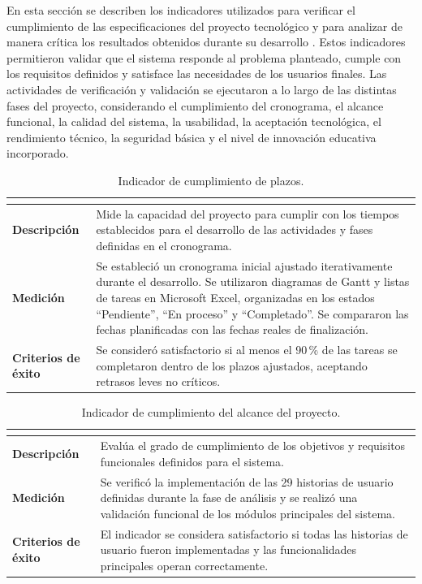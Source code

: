 En esta sección se describen los indicadores utilizados para verificar el cumplimiento de las especificaciones del proyecto tecnológico y para analizar de manera crítica los resultados obtenidos durante su desarrollo \cite{vlachogianni2022sus,brooke1996sus,davis1989tam}. Estos indicadores permitieron validar que el sistema responde al problema planteado, cumple con los requisitos definidos y satisface las necesidades de los usuarios finales. Las actividades de verificación y validación se ejecutaron a lo largo de las distintas fases del proyecto, considerando el cumplimiento del cronograma, el alcance funcional, la calidad del sistema, la usabilidad, la aceptación tecnológica, el rendimiento técnico, la seguridad básica y el nivel de innovación educativa incorporado.

\begin{table}[H]
\centering
\caption{Indicador de cumplimiento de plazos.}
\label{tab:ind_plazos}
\footnotesize
\renewcommand{\arraystretch}{1.25}
\begin{tabularx}{\textwidth}{|>{\bfseries}p{3.2cm}|X|}
\hline
\rowcolor{headblue}\multicolumn{2}{|c|}{\textbf{Cumplimiento de plazos}}\\\hline
Descripción & Mide la capacidad del proyecto para cumplir con los tiempos establecidos para el desarrollo de las actividades y fases definidas en el cronograma. \\\hline
Medición & Se estableció un cronograma inicial ajustado iterativamente durante el desarrollo. Se utilizaron diagramas de Gantt y listas de tareas en Microsoft Excel, organizadas en los estados ``Pendiente'', ``En proceso'' y ``Completado''. Se compararon las fechas planificadas con las fechas reales de finalización. \\\hline
Criterios de éxito & Se consideró satisfactorio si al menos el 90\,\% de las tareas se completaron dentro de los plazos ajustados, aceptando retrasos leves no críticos. \\\hline
\end{tabularx}
\end{table}
\fuenteautor

\begin{table}[H]
\centering
\caption{Indicador de cumplimiento del alcance del proyecto.}
\label{tab:ind_alcance}
\footnotesize
\renewcommand{\arraystretch}{1.25}
\begin{tabularx}{\textwidth}{|>{\bfseries}p{3.2cm}|X|}
\hline
\rowcolor{headblue}\multicolumn{2}{|c|}{\textbf{Cumplimiento del alcance}}\\\hline
Descripción & Evalúa el grado de cumplimiento de los objetivos y requisitos funcionales definidos para el sistema. \\\hline
Medición & Se verificó la implementación de las 29 historias de usuario definidas durante la fase de análisis y se realizó una validación funcional de los módulos principales del sistema. \\\hline
Criterios de éxito & El indicador se considera satisfactorio si todas las historias de usuario fueron implementadas y las funcionalidades principales operan correctamente. \\\hline
\end{tabularx}
\end{table}
\fuenteautor

